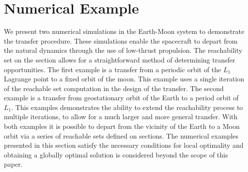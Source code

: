 \documentclass[smallcondensed]{svjour3}
\begin{document}
\section{Numerical Example}\label{sec:simulation}
We present two numerical simulations in the Earth-Moon system to demonstrate the transfer procedure.
These simulations enable the spacecraft to depart from the natural dynamics through the use of low-thrust propulsion.
The reachability set on the \Poincare section allows for a straightforward method of determining transfer opportunities.
The first example is a transfer from a periodic orbit of the \( L_1 \) Lagrange point to a fixed orbit of the moon.
This example uses a single iteration of the reachable set computation in the design of the transfer.
The second example is a transfer from geostationary orbit of the Earth to a period orbit of \( L_1 \). 
This examples demonstrates the ability to extend the reachability process to multiple iterations, to allow for a much larger and more general transfer.
With both examples it is possible to depart from the vicinity of the Earth to a Moon orbit via a series of reachable sets defined on \Poincare sections.
The numerical examples presented in this section satisfy the necessary conditions for local optimality and obtaining a globally optimal solution is considered beyond the scope of this paper.
\end{document}
